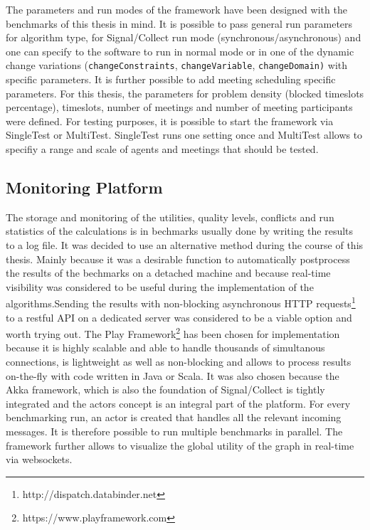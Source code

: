 \newline \newline
The parameters and run modes of the framework have been designed with the benchmarks of this thesis in mind.  It is possible to pass general run parameters for algorithm type, for Signal/Collect run mode (synchronous/asynchronous) and one can specify to the software to run in normal mode or in one of the dynamic change variations (\texttt{changeConstraints}, \texttt{changeVariable}, \texttt{changeDomain)} with specific parameters.  It is further possible to add meeting scheduling specific parameters. For this thesis, the parameters for problem density (blocked timeslots percentage), timeslots, number of meetings and number of meeting participants were defined. For testing purposes, it is possible to start the framework via SingleTest or MultiTest. SingleTest runs one setting once and MultiTest allows to specifiy a range and scale of agents and meetings that should be tested.

\subsection{Monitoring Platform}
The  storage and monitoring of the utilities, quality levels, conflicts and run statistics of the calculations is in bechmarks usually done by writing the results to a log file. It was decided to use an alternative method during the course of this thesis. Mainly because it was a desirable function  to automatically postprocess the results of the bechmarks on a detached machine and because real-time visibility was considered to be useful during the implementation of the algorithms.\newline Sending the results with non-blocking asynchronous HTTP requests\footnote{http://dispatch.databinder.net} to a restful API on a dedicated server was considered to be a viable option and worth trying out. The Play Framework\footnote{https://www.playframework.com} has been chosen for implementation because it is highly scalable and able to handle thousands of simultanous connections, is lightweight as well as non-blocking and allows to process results on-the-fly with code written in Java or Scala. It was also chosen because the Akka framework, which is also the foundation of Signal/Collect is tightly integrated and the actors concept is an integral part of the platform. For every benchmarking run, an actor is created that handles all the relevant incoming messages. It is therefore possible to run multiple benchmarks in parallel. The framework further allows to visualize the global utility of the graph in real-time via websockets.

